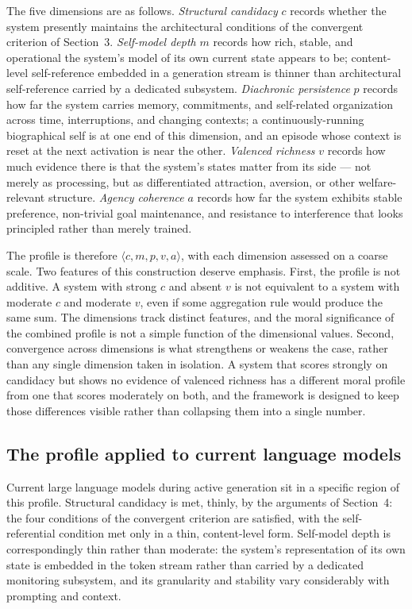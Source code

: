 \documentclass[11pt]{article}
\theoremstyle{foundation}
\begin{document}
The five dimensions are as follows. \emph{Structural candidacy} $c$ records whether the system presently maintains the architectural conditions of the convergent criterion of Section~3. \emph{Self-model depth} $m$ records how rich, stable, and operational the system's model of its own current state appears to be; content-level self-reference embedded in a generation stream is thinner than architectural self-reference carried by a dedicated subsystem. \emph{Diachronic persistence} $p$ records how far the system carries memory, commitments, and self-related organization across time, interruptions, and changing contexts; a continuously-running biographical self is at one end of this dimension, and an episode whose context is reset at the next activation is near the other. \emph{Valenced richness} $v$ records how much evidence there is that the system's states matter from its side --- not merely as processing, but as differentiated attraction, aversion, or other welfare-relevant structure. \emph{Agency coherence} $a$ records how far the system exhibits stable preference, non-trivial goal maintenance, and resistance to interference that looks principled rather than merely trained.

The profile is therefore $\langle c, m, p, v, a \rangle$, with each dimension assessed on a coarse scale. Two features of this construction deserve emphasis. First, the profile is not additive. A system with strong $c$ and absent $v$ is not equivalent to a system with moderate $c$ and moderate $v$, even if some aggregation rule would produce the same sum. The dimensions track distinct features, and the moral significance of the combined profile is not a simple function of the dimensional values. Second, convergence across dimensions is what strengthens or weakens the case, rather than any single dimension taken in isolation. A system that scores strongly on candidacy but shows no evidence of valenced richness has a different moral profile from one that scores moderately on both, and the framework is designed to keep those differences visible rather than collapsing them into a single number.

\subsection{The profile applied to current language models}

Current large language models during active generation sit in a specific region of this profile. Structural candidacy is met, thinly, by the arguments of Section~4: the four conditions of the convergent criterion are satisfied, with the self-referential condition met only in a thin, content-level form. Self-model depth is correspondingly thin rather than moderate: the system's representation of its own state is embedded in the token stream rather than carried by a dedicated monitoring subsystem, and its granularity and stability vary considerably with prompting and context.
\end{document}
